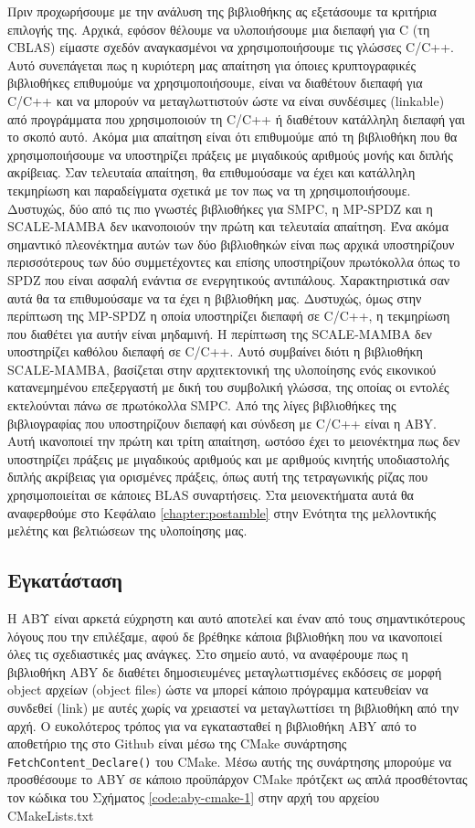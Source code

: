 Πριν προχωρήσουμε με την ανάλυση της βιβλιοθήκης ας εξετάσουμε τα κριτήρια επιλογής της. Αρχικά, εφόσον θέλουμε να υλοποιήσουμε μια διεπαφή για C (τη CBLAS) είμαστε σχεδόν αναγκασμένοι να χρησιμοποιήσουμε τις γλώσσες C/C++. Αυτό συνεπάγεται πως η κυριότερη μας απαίτηση για όποιες κρυπτογραφικές βιβλιοθήκες επιθυμούμε να χρησιμοποιήσουμε, είναι να διαθέτουν διεπαφή για C/C++ και να μπορούν να μεταγλωττιστούν ώστε να είναι συνδέσιμες (linkable) από προγράμματα που χρησιμοποιούν τη C/C++ ή διαθέτουν κατάλληλη διεπαφή γαι το σκοπό αυτό. Ακόμα μια απαίτηση είναι ότι επιθυμούμε από τη βιβλιοθήκη που θα χρησιμοποιήσουμε να υποστηρίζει πράξεις με μιγαδικούς αριθμούς μονής και διπλής ακρίβειας. Σαν τελευταία απαίτηση, θα επιθυμούσαμε να έχει και κατάλληλη τεκμηρίωση και παραδείγματα σχετικά με τον πως να τη χρησιμοποιήσουμε. Δυστυχώς, δύο από τις πιο γνωστές βιβλιοθήκες για SMPC, η MP-SPDZ και η SCALE-MAMBA δεν ικανοποιούν την πρώτη και τελευταία απαίτηση. Ένα ακόμα σημαντικό πλεονέκτημα αυτών των δύο βιβλιοθηκών είναι πως αρχικά υποστηρίζουν περισσότερους των δύο συμμετέχοντες και επίσης υποστηρίζουν πρωτόκολλα όπως το SPDZ που είναι ασφαλή ενάντια σε ενεργητικούς αντιπάλους. Χαρακτηριστικά σαν αυτά θα τα επιθυμούσαμε να τα έχει η βιβλιοθήκη μας. Δυστυχώς, όμως στην περίπτωση της MP-SPDZ η οποία υποστηρίζει διεπαφή σε C/C++, η τεκμηρίωση που διαθέτει για αυτήν είναι μηδαμινή. Η περίπτωση της SCALE-MAMBA δεν υποστηρίζει καθόλου διεπαφή σε C/C++. Αυτό συμβαίνει διότι η βιβλιοθήκη SCALE-MAMBA, βασίζεται στην αρχιτεκτονική της υλοποίησης ενός εικονικού κατανεμημένου επεξεργαστή με δική του συμβολική γλώσσα, της οποίας οι εντολές εκτελούνται πάνω σε πρωτόκολλα SMPC. Από της λίγες βιβλιοθήκες της βιβλιογραφίας που υποστηρίζουν διεπαφή και σύνδεση με C/C++ είναι η ABY. Αυτή ικανοποιεί την πρώτη και τρίτη απαίτηση, ωστόσο έχει το μειονέκτημα πως δεν υποστηρίζει πράξεις με μιγαδικούς αριθμούς και με αριθμούς κινητής υποδιαστολής διπλής ακρίβειας για ορισμένες πράξεις, όπως αυτή της τετραγωνικής ρίζας που χρησιμοποιείται σε κάποιες BLAS συναρτήσεις. Στα μειονεκτήματα αυτά θα αναφερθούμε στο Κεφάλαιο \ref{chapter:postamble} στην Ενότητα της μελλοντικής μελέτης και βελτιώσεων της υλοποίησης μας.

\subsection{Εγκατάσταση}

H ΑΒΥ είναι αρκετά εύχρηστη και αυτό αποτελεί και έναν από τους σημαντικότερους λόγους που την επιλέξαμε, αφού δε βρέθηκε κάποια βιβλιοθήκη που να ικανοποιεί όλες τις σχεδιαστικές μας ανάγκες. Στο σημείο αυτό, να αναφέρουμε πως η βιβλιοθήκη ABY δε διαθέτει δημοσιευμένες μεταγλωττισμένες εκδόσεις σε μορφή object αρχείων (object files) ώστε να μπορεί κάποιο πρόγραμμα κατευθείαν να συνδεθεί (link) με αυτές χωρίς να χρειαστεί να μεταγλωττίσει τη βιβλιοθήκη από την αρχή. Ο ευκολότερος τρόπος για να εγκατασταθεί η βιβλιοθήκη ABY από το αποθετήριο της στο Github είναι μέσω της CMake συνάρτησης \texttt{FetchContent_Declare()} του CMake. Μέσω αυτής της συνάρτησης μπορούμε να προσθέσουμε το ABY σε κάποιο προϋπάρχον CMake πρότζεκτ ως απλά προσθέτοντας τον κώδικα του Σχήματος \ref{code:aby-cmake-1} στην αρχή του αρχείου CMakeLists.txt

